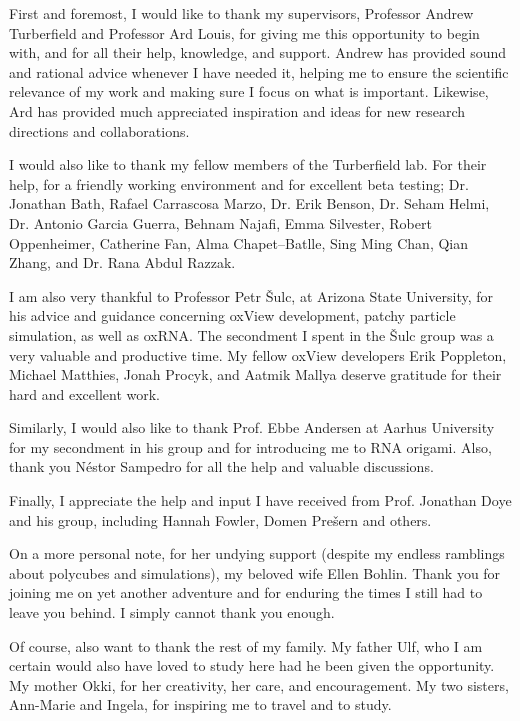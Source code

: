 

First and foremost, I would like to thank my supervisors, Professor Andrew Turberfield and Professor Ard Louis, for giving me this opportunity to begin with, and for all their help, knowledge, and support. Andrew has provided sound and rational advice whenever I have needed it, helping me to ensure the scientific relevance of my work and making sure I focus on what is important. Likewise, Ard has provided much appreciated inspiration and ideas for new research directions and collaborations.

I would also like to thank my fellow members of the Turberfield lab. For their help, for a friendly working environment and for excellent beta testing; Dr. Jonathan Bath, Rafael Carrascosa Marzo, Dr. Erik Benson, Dr. Seham Helmi, Dr. Antonio Garcia Guerra, Behnam Najafi, Emma Silvester, Robert Oppenheimer, Catherine Fan, Alma Chapet--Batlle, Sing Ming Chan, Qian Zhang, and Dr. Rana Abdul Razzak.

I am also very thankful to Professor Petr {\v{S}}ulc, at Arizona State University, for his advice and guidance concerning oxView development, patchy particle simulation, as well as oxRNA. The secondment I spent in the {\v{S}}ulc group was a very valuable and productive time. My fellow oxView developers Erik Poppleton, Michael Matthies, Jonah Procyk, and Aatmik Mallya deserve gratitude for their hard and excellent work.

Similarly, I would also like to thank Prof. Ebbe Andersen at Aarhus University for my secondment in his group and for introducing me to RNA origami. Also, thank you Néstor Sampedro for all the help and valuable discussions.

Finally, I appreciate the help and input I have received from Prof. Jonathan Doye and his group, including Hannah Fowler, Domen Prešern and others.

On a more personal note, for her undying support (despite my endless ramblings about polycubes and simulations), my beloved wife Ellen Bohlin. Thank you for joining me on yet another adventure and for enduring the times I still had to leave you behind. I simply cannot thank you enough.

Of course, also want to thank the rest of my family. My father Ulf, who I am certain would also have loved to study here had he been given the opportunity. My mother Okki, for her creativity, her care, and encouragement. My two sisters, Ann-Marie and Ingela, for inspiring me to travel and to study.

